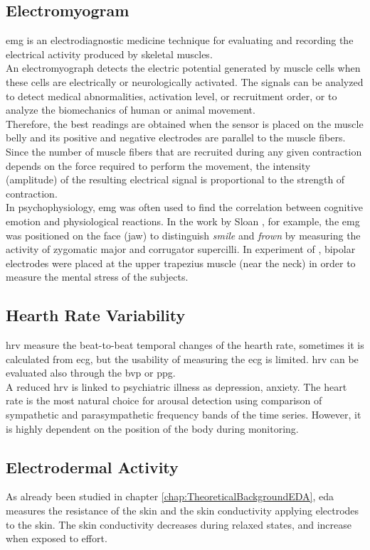 \subsection{Electromyogram}
\gls{emg} is an electrodiagnostic medicine technique for evaluating and recording the electrical activity produced by skeletal muscles.
\\
An electromyograph detects the electric potential generated by muscle cells when these cells are electrically or neurologically activated. The signals can be analyzed to detect medical abnormalities, activation level, or recruitment order, or to analyze the biomechanics of human or animal movement.
\\ \indent
Therefore, the best readings are obtained when the sensor is placed on the muscle belly and its positive and negative electrodes are parallel to the muscle fibers. Since the number of muscle fibers that are recruited during any given contraction depends on the force required to perform the movement, the intensity (amplitude) of the resulting electrical signal is proportional to the strength of contraction.
\\ \indent
In psychophysiology, \gls{emg} was often used to find the correlation between cognitive emotion and physiological reactions. In the work by Sloan \cite{sloan2004emotion}, for example, the \gls{emg} was positioned on the face (jaw) to distinguish \textit{smile} and \textit{frown} by measuring the activity of zygomatic major and corrugator supercilli. In experiment of \cite{kim2008emotion}, bipolar electrodes were placed at the upper trapezius muscle (near the neck) in order to measure the mental stress of the subjects.

\subsection{Hearth Rate Variability}
\gls{hrv} measure the beat-to-beat temporal changes of the hearth rate, sometimes it is calculated from \gls{ecg}, but the usability of measuring the \gls{ecg} is limited. \gls{hrv} can be evaluated also through the \gls{bvp} or \gls{ppg}.
\\ \indent
A reduced \gls{hrv} is linked to psychiatric illness as depression, anxiety. The heart rate is the most natural choice for arousal detection using comparison of sympathetic and parasympathetic frequency bands of the time series. However, it is highly dependent on the position of the body during monitoring.

\subsection{Electrodermal Activity}
As already been studied in chapter \ref{chap:TheoreticalBackgroundEDA}, \gls{eda} measures the resistance of the skin and the skin conductivity applying electrodes to the skin. The skin conductivity decreases during relaxed states, and increase when exposed to effort.

